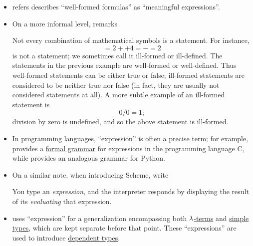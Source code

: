 \begin{comments}
\begin{itemize}
    \item {} refers describes \enquote{well-formed formulas} as \enquote{meaningful expressions}.

    \item On a more informal level,  remarks
    \begin{displayquote}
      Not every combination of mathematical symbols is a statement. For instance,
      \begin{equation*}
        = 2 ++ 4 = - = 2
      \end{equation*}
      is not a statement; we sometimes call it ill-formed or ill-defined. The statements in the previous example are well-formed or well-defined. Thus well-formed statements can be either true or false; ill-formed statements are considered to be neither true
      nor false (in fact, they are usually not considered statements at all). A more subtle example of an ill-formed statement is
      \begin{equation*}
        0 / 0 = 1;
      \end{equation*}
      division by zero is undefined, and so the above statement is ill-formed.
    \end{displayquote}

    \item In programming languages, \enquote{expression} is often a precise term; for example, \cite[\S 6.5]{ISO:9899:2018} provides a \hyperref[def:formal_grammar]{formal grammar} for expressions in the programming language C, while \cite{PythonDocs:3.13:expressions} provides an analogous grammar for Python.

    \item On a similar note, when introducing Scheme,  write
    \begin{displayquote}
      You type an \textit{expression}, and the interpreter responds by displaying the result of its \textit{evaluating} that expression.
    \end{displayquote}

    \item {} uses \enquote{expression} for a generalization encompassing both \hyperref[def:lambda_term]{\( \mathrm{\lambda} \)-terms} and \hyperref[def:simple_type]{simple types}, which are kept separate before that point. These \enquote{expressions} are used to introduce \hyperref[con:dependent_types]{dependent types}.
  \end{itemize}
\end{comments}

